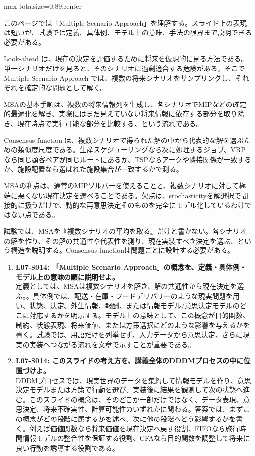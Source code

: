 \begin{minipage}[t]{0.58\textwidth}
\begin{adjustbox}{max totalsize={\textwidth}{0.89\textheight},center}
\begin{minipage}{\textwidth}\scriptsize
{}このページでは「Multiple Scenario Approach」を理解する。スライド上の表現は短いが、試験では定義、具体例、モデル上の意味、手法の限界まで説明できる必要がある。\par
Look-ahead は、現在の決定を評価するために将来を仮想的に見る方法である。単一シナリオだけを見ると、そのシナリオに過剰適合する危険がある。そこで Multiple Scenario Approach では、複数の将来シナリオをサンプリングし、それぞれを確定的な問題として解く。\par
MSAの基本手順は、複数の将来情報列を生成し、各シナリオでMIPなどの確定的最適化を解き、実際にはまだ見えていない将来情報に依存する部分を取り除き、現在時点で実行可能な部分を比較する、という流れである。\par
Consensus function は、複数シナリオで得られた解の中から代表的な解を選ぶための類似度尺度である。生産スケジューリングなら次に処理するジョブ、VRPなら同じ顧客ペアが同じルートにあるか、TSPならアークや隣接関係が一致するか、施設配置なら選ばれた施設集合が一致するかで測る。\par
MSAの利点は、通常のMIPソルバーを使えることと、複数シナリオに対して極端に悪くない現在決定を選べることである。欠点は、stochasticityを解選択で間接的に扱うだけで、動的な再意思決定そのものを完全にモデル化しているわけではない点である。\par
試験では、MSAを『複数シナリオの平均を取る』だけと書かない。各シナリオの解を作り、その解の共通性や代表性を測り、現在実装すべき決定を選ぶ、という構造を説明する。Consensus functionは問題ごとに設計する必要がある。\par{}\begin{enumerate}\item \textbf{L07-S014: 「Multiple Scenario Approach」の概念を、定義・具体例・モデル上の意味の順に説明せよ。}\\定義としては、MSAは複数シナリオを解き、解の共通性から現在決定を選ぶ。。具体例では、配送・在庫・フードデリバリーのような現実問題を用い、状態、決定、外生情報、報酬、または情報モデル/意思決定モデルのどこに対応するかを明示する。モデル上の意味として、この概念が目的関数、制約、状態表現、将来価値、または方策選択にどのような影響を与えるかを書く。試験では、用語だけを列挙せず、入力データから意思決定、さらに現実の実装へつながる流れを文章で示すことが重要である。\item \textbf{L07-S014: このスライドの考え方を、講義全体のDDDMプロセスの中に位置づけよ。}\\DDDMプロセスでは、現実世界のデータを集約して情報モデルを作り、意思決定モデルまたは方策で行動を選び、実装後に結果を観測して次の状態へ進む。このスライドの概念は、そのどこか一部だけではなく、データ表現、意思決定、将来不確実性、計算可能性のいずれかに関わる。答案では、まずこの概念がどの段階に属するかを述べ、次に他の段階へどう影響するかを書く。例えば価値関数なら将来価値を現在決定へ戻す役割、FIFOなら旅行時間情報モデルの整合性を保証する役割、CFAなら目的関数を調整して将来に良い行動を誘導する役割である。\end{enumerate}

\end{minipage}
\end{adjustbox}
\end{minipage}
